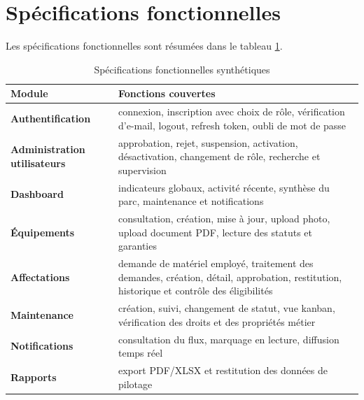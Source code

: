 \section{Spécifications fonctionnelles}
Les spécifications fonctionnelles sont résumées dans le tableau \ref{tab:specs-fonctionnelles}.

\begin{table}[H]
\centering
\caption{Spécifications fonctionnelles synthétiques}
\label{tab:specs-fonctionnelles}
\begin{tabularx}{\textwidth}{>{\bfseries}p{3cm}X}
\toprule
Module & Fonctions couvertes \\
\midrule
Authentification & connexion, inscription avec choix de rôle, vérification d'e-mail, logout, refresh token, oubli de mot de passe \\
Administration utilisateurs & approbation, rejet, suspension, activation, désactivation, changement de rôle, recherche et supervision \\
Dashboard & indicateurs globaux, activité récente, synthèse du parc, maintenance et notifications \\
Équipements & consultation, création, mise à jour, upload photo, upload document PDF, lecture des statuts et garanties \\
Affectations & demande de matériel employé, traitement des demandes, création, détail, approbation, restitution, historique et contrôle des éligibilités \\
Maintenance & création, suivi, changement de statut, vue kanban, vérification des droits et des propriétés métier \\
Notifications & consultation du flux, marquage en lecture, diffusion temps réel \\
Rapports & export PDF/XLSX et restitution des données de pilotage \\
\bottomrule
\end{tabularx}
\end{table}

